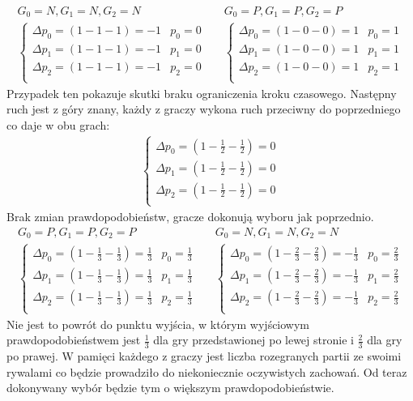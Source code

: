 \begin{align*}
G_0 = N, G_1 = N, G_2 = N && G_0 = P, G_1 = P, G_2 = P \\
\left\{
\begin{array}{ll}
\Delta p_0 = (1 - 1 - 1) =  -1 & p_0=0\\
\Delta p_1 = (1 - 1 - 1) =  -1 & p_1= 0\\
\Delta p_2 = (1 - 1 - 1) =  -1 & p_2=0\\
\end{array} 
\right. &&
\left\{
\begin{array}{ll}
\Delta p_0 = (1 - 0 - 0) =  1 & p_0= 1\\
\Delta p_1 = (1 - 0 - 0) =  1 & p_1= 1\\
\Delta p_2 = (1 - 0 - 0) =  1 & p_2= 1\\
\end{array}
\right.
\end{align*}
Przypadek ten pokazuje skutki braku ograniczenia kroku czasowego. Następny ruch jest z góry znany, każdy z graczy wykona ruch przeciwny do poprzedniego co daje w obu grach:
\begin{align*}
\left\{
\begin{array}{l}
\Delta p_0 = (1 - \frac{1}{2} - \frac{1}{2}) =  0 \\
\Delta p_1 = (1 - \frac{1}{2} - \frac{1}{2}) =  0 \\
\Delta p_2 = (1 - \frac{1}{2} - \frac{1}{2}) =  0 \\
\end{array} 
\right.
\end{align*}
Brak zmian prawdopodobieństw, gracze dokonują wyboru jak poprzednio.
\begin{align*}
G_0 = P, G_1 = P, G_2 = P && G_0 = N, G_1 = N, G_2 = N \\
\left\{
\begin{array}{ll}
\Delta p_0 = (1 - \frac{1}{3} - \frac{1}{3}) =  \frac{1}{3} & p_0= \frac{1}{3}\\
\Delta p_1 = (1 - \frac{1}{3} - \frac{1}{3}) =  \frac{1}{3} & p_1= \frac{1}{3}\\
\Delta p_2 = (1 - \frac{1}{3} - \frac{1}{3}) =  \frac{1}{3} & p_2= \frac{1}{3}\\
\end{array} 
\right. &&
\left\{
\begin{array}{ll}
\Delta p_0 = (1 - \frac{2}{3} - \frac{2}{3}) =  -\frac{1}{3} & p_0= \frac{2}{3}\\
\Delta p_1 = (1 - \frac{2}{3} - \frac{2}{3}) =  -\frac{1}{3} & p_1= \frac{2}{3}\\
\Delta p_2 = (1 - \frac{2}{3} - \frac{2}{3}) =  -\frac{1}{3} & p_2= \frac{2}{3}\\
\end{array}
\right.
\end{align*}
Nie jest to powrót do punktu wyjścia, w którym wyjściowym prawdopodobieństwem jest $\frac{1}{3}$ dla gry przedstawionej po lewej stronie i $\frac{2}{3}$ dla gry po prawej. W pamięci każdego z graczy jest liczba rozegranych partii ze swoimi rywalami co będzie prowadziło do niekoniecznie oczywistych zachowań.
Od teraz dokonywany wybór będzie tym o większym prawdopodobieństwie.


